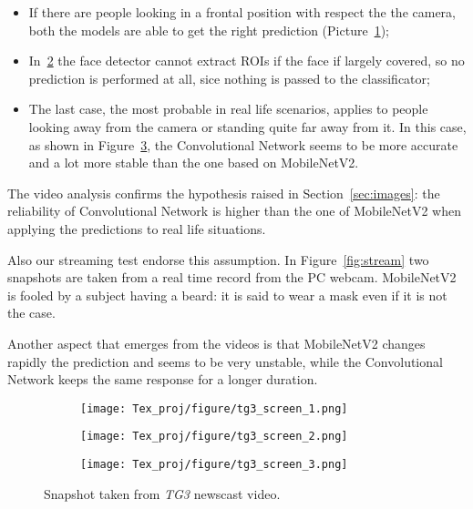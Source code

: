\documentclass[10pt,twocolumn,letterpaper]{article}
\begin{document}
\begin{itemize}
    \item If there are people looking in a frontal position with respect the the camera, both the models are able to get the right prediction (Picture~\ref{fig:tg_1});
    \item In~\ref{fig:tg_2} the face detector cannot extract ROIs if the face if largely covered, so no prediction is performed at all, sice nothing is passed to the classificator;
    \item The last case, the most probable in real life scenarios, applies to people looking away from the camera or standing quite far away from it. In this case, as shown in Figure~\ref{fig:tg_3}, the Convolutional Network seems to be more accurate and a lot more stable than the one based on MobileNetV2. 
\end{itemize}

The video analysis confirms the hypothesis raised in Section~\ref{sec:images}: the reliability of Convolutional Network is higher than the one of MobileNetV2 when applying the predictions to real life situations.

Also our streaming test endorse this assumption. In Figure~\ref{fig:stream} two snapshots are taken from a real time record from the PC webcam. MobileNetV2 is fooled by a subject having a beard: it is said to wear a mask even if it is not the case.

Another aspect that emerges from the videos is that MobileNetV2 changes rapidly the prediction and seems to be very unstable, while the Convolutional Network keeps the same response for a longer duration.

\begin{figure}[htp]
     \centering
     \begin{subfigure}[b]{0.5\textwidth}
         \centering
         \texttt{[image: Tex\_proj/figure/tg3\_screen\_1.png]}
         \caption{}
         \label{fig:tg_1}
     \end{subfigure}
     \begin{subfigure}[b]{0.5\textwidth}
         \centering
         \texttt{[image: Tex\_proj/figure/tg3\_screen\_2.png]}
         \caption{}
         \label{fig:tg_2}
     \end{subfigure}
     \begin{subfigure}[b]{0.5\textwidth}
         \centering
         \texttt{[image: Tex\_proj/figure/tg3\_screen\_3.png]}
         \caption{}
         \label{fig:tg_3}
     \end{subfigure}
     \caption{Snapshot taken from \textit{TG3} newscast video.}
     \label{fig:tg}
\end{figure}
\end{document}
